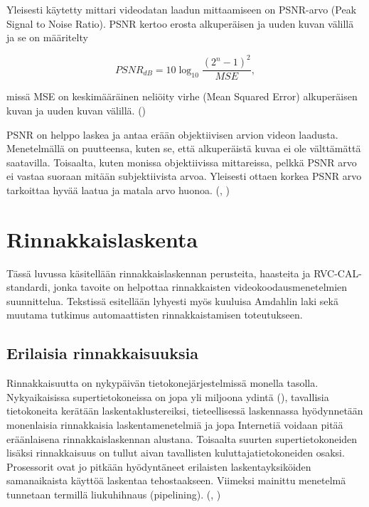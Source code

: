 Yleisesti käytetty mittari videodatan laadun mittaamiseen on PSNR-arvo (Peak
Signal to Noise Ratio). PSNR kertoo erosta alkuperäisen ja uuden kuvan välillä
ja se on määritelty

\begin{center}
\begin{equation}PSNR_{dB} = 10\log_{10}\frac{(2^n - 1)^2}{MSE},\end{equation}
\end{center}

missä MSE on keskimääräinen neliöity virhe (Mean Squared Error) alkuperäisen 
kuvan ja uuden kuvan välillä. (\citealt{h264})

PSNR on helppo laskea ja antaa erään objektiivisen arvion videon laadusta.
Menetelmällä on puutteensa, kuten se, että alkuperäistä kuvaa ei ole
välttämättä saatavilla. Toisaalta, kuten monissa objektiivissa mittareissa,
pelkkä PSNR arvo ei vastaa suoraan mitään subjektiivista arvoa. Yleisesti
ottaen korkea PSNR arvo tarkoittaa hyvää laatua ja matala arvo huonoa.
(\citealt{h264}, \citealt{du})

\newpage

\section{Rinnakkaislaskenta}

Tässä luvussa käsitellään rinnakkaislaskennan perusteita, haasteita ja
RVC-CAL-standardi, jonka tavoite on helpottaa rinnakkaisten
videokoodausmenetelmien suunnittelua. Tekstissä esitellään lyhyesti
myös kuuluisa Amdahlin laki sekä muutama tutkimus automaattisten
rinnakkaistamisen toteutukseen.

\subsection{Erilaisia rinnakkaisuuksia}

Rinnakkaisuutta on nykypäivän tietokonejärjestelmissä monella tasolla.
Nykyaikaisissa supertietokoneissa on jopa yli miljoona ydintä (\citealt{top500}),
tavallisia tietokoneita kerätään laskentaklustereiksi, tieteellisessä
laskennassa hyödynnetään monenlaisia rinnakkaisia laskentamenetelmiä ja jopa
Internetiä voidaan pitää eräänlaisena rinnakkaislaskennan alustana. Toisaalta
suurten supertietokoneiden lisäksi rinnakkaisuus on tullut aivan tavallisten
kuluttajatietokoneiden osaksi. Prosessorit ovat jo pitkään hyödyntäneet
erilaisten laskentayksiköiden samanaikaista käyttöä laskentaa tehostaakseen.
Viimeksi mainittu menetelmä tunnetaan termillä liukuhihnaus (pipelining).
(\citealt{intro}, \citealt{rauber})

